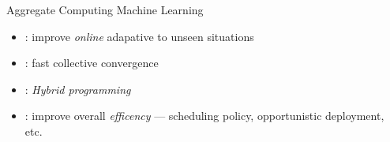 \begin{frame}{Aggregate Computing \faPlus[left] Machine Learning~\cite{research}}
  \begin{card}[Why?]
    \begin{itemize} 
      \item \textbf{}: improve \textit{online} adapative to unseen situations
      \item \textbf{}: fast collective convergence
      \item \textbf{}: \textit{Hybrid programming}
      \item \textbf{}: improve overall \textit{efficency} --- scheduling policy, opportunistic deployment, etc.
    \end{itemize}
  \end{card}
  
\end{frame}